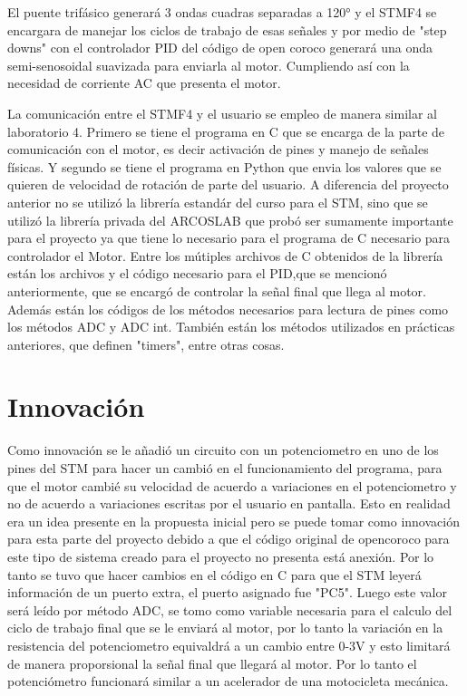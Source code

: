 \documentclass[letterpaper]{article}
\begin{document}
El puente trifásico generará 3 ondas cuadras separadas a 120° y el STMF4 se encargara de manejar los ciclos de trabajo de esas señales y por medio de "step downs" con el controlador PID del código de open coroco generará una onda semi-senosoidal suavizada para enviarla al motor. 
Cumpliendo así con la necesidad de corriente AC que presenta el motor.
 
La comunicación entre el STMF4 y el usuario se empleo de manera similar al laboratorio 4. Primero se tiene el programa en C que se encarga de la parte de comunicación
con el motor, es decir activación de pines y manejo de señales físicas. Y segundo se tiene el programa en Python que envia los valores que se quieren de velocidad de rotación de parte del usuario.
A diferencia del proyecto anterior no se utilizó la librería estandár del curso para el STM, sino que se utilizó la librería privada del ARCOSLAB que probó ser sumamente importante para el proyecto ya
que tiene lo necesario para el programa de C necesario para controlador el Motor. 
Entre los mútiples archivos de C obtenidos de la librería están los archivos y el código necesario para el PID,que se mencionó anteriormente, que se encargó
de controlar la señal final que llega al motor. Además están los códigos de los métodos necesarios para lectura de pines como los métodos ADC y ADC int. También están los métodos utilizados en prácticas
anteriores, que definen "timers", entre otras cosas.
 
\section{Innovación}
Como innovación se le añadió un circuito con un potenciometro en uno de los pines del STM para hacer un cambió en el funcionamiento del programa, para que el motor cambié su velocidad 
de acuerdo a variaciones en el potenciometro y no de acuerdo a variaciones escritas por el usuario en pantalla. Esto en realidad era un idea presente en la propuesta inicial pero se puede tomar como innovación
para esta parte del proyecto debido a que el código original de opencoroco para este tipo de sistema creado para el proyecto no presenta está anexión. Por lo tanto se tuvo que hacer cambios en el código en C
para que el STM leyerá información de un puerto extra, el puerto asignado fue "PC5". Luego este valor será leído por método ADC, se tomo como variable necesaria para el calculo del ciclo de trabajo final que se le enviará al motor, por lo tanto
la variación en la resistencia del potenciometro equivaldrá a un cambio entre 0-3V y esto limitará de manera proporsional la señal final que llegará al motor. Por lo tanto el potenciómetro funcionará 
similar a un acelerador de una motocicleta mecánica.
\end{document}
